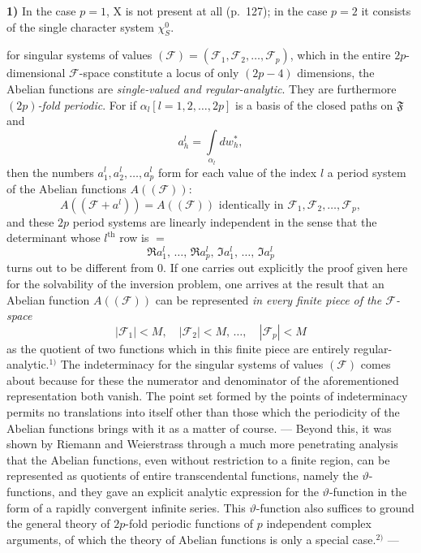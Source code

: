 \documentclass{article}
\begin{document}
\textbf{1)} In the case $p = 1$, $\mathrm{X}$ is not present at all (p.~127); in the case $p = 2$ it consists of the single character system $\chi_S^0$.

for singular systems of values $(\mathcal{F}) = (\mathcal{F}_1, \mathcal{F}_2, \dots, \mathcal{F}_p)$, which in the entire $2p$-dimensional $\mathcal{F}$-space constitute a locus of only $(2p - 4)$ dimensions, the Abelian functions are \emph{single-valued and regular-analytic}. They are furthermore \emph{$(2p)$-fold periodic}. For if $\alpha_l [l = 1, 2, \dots, 2p]$ is a basis of the closed paths on $\mathfrak{F}$ and
\[ a_h^l = \int\limits_{\alpha_l} dw_h^*, \]
then the numbers $a_1^l, a_2^l, \dots, a_p^l$ form for each value of the index $l$ a period system of the Abelian functions $A((\mathcal{F}))$:
\[ A((\mathcal{F} + a^l)) = A((\mathcal{F})) \text{ identically in } \mathcal{F}_1, \mathcal{F}_2, \dots, \mathcal{F}_p, \]
and these $2p$ period systems are linearly independent in the sense that the determinant whose $l^{\text{th}}$ row is $=$
\[ \Re a_1^l, \, \dots, \, \Re a_p^l, \, \Im a_1^l, \, \dots, \, \Im a_p^l \]
turns out to be different from 0. If one carries out explicitly the proof given here for the solvability of the inversion problem, one arrives at the result that an Abelian function $A((\mathcal{F}))$ can be represented \emph{in every finite piece of the $\mathcal{F}$-space}
\[ |\mathcal{F}_1| < M, \quad |\mathcal{F}_2| < M, \, \dots, \quad |\mathcal{F}_p| < M \]
as the quotient of two functions which in this finite piece are entirely regular-analytic.${}^{1)}$ The indeterminacy for the singular systems of values $(\mathcal{F})$ comes about because for these the numerator and denominator of the aforementioned representation both vanish. The point set formed by the points of indeterminacy permits no translations into itself other than those which the periodicity of the Abelian functions brings with it as a matter of course. --- Beyond this, it was shown by Riemann and Weierstrass through a much more penetrating analysis that the Abelian functions, even without restriction to a finite region, can be represented as quotients of entire transcendental functions, namely the $\vartheta$-functions, and they gave an explicit analytic expression for the $\vartheta$-function in the form of a rapidly convergent infinite series. This $\vartheta$-function also suffices to ground the general theory of $2p$-fold periodic functions of $p$ independent complex arguments, of which the theory of Abelian functions is only a special case.${}^{2)}$ ---
\end{document}
